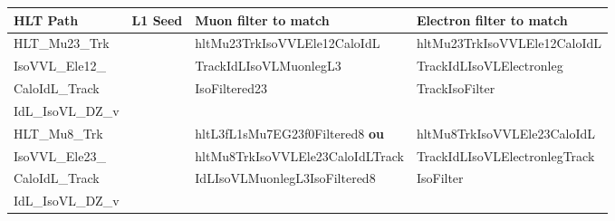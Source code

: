 {\footnotesize
\begin{tabularx}{\textwidth}{llXX}
\toprule
HLT Path & L1 Seed & Muon filter to match & Electron filter to match \\
\midrule
HLT\_Mu23\_Trk
&
\todo{???}
&
hltMu23TrkIsoVVLEle12CaloIdL
&
hltMu23TrkIsoVVLEle12CaloIdL
\\
IsoVVL\_Ele12\_
&
&
TrackIdLIsoVLMuonlegL3
&
TrackIdLIsoVLElectronleg
\\
CaloIdL\_Track
&
&
IsoFiltered23
&
TrackIsoFilter
\\
IdL\_IsoVL\_DZ\_v
\\\hline
HLT\_Mu8\_Trk
&
\todo{???}
&
hltL3fL1sMu7EG23f0Filtered8 \textbf{ou}
&
hltMu8TrkIsoVVLEle23CaloIdL
\\
IsoVVL\_Ele23\_
&
&
hltMu8TrkIsoVVLEle23CaloIdLTrack
&
TrackIdLIsoVLElectronlegTrack
\\
CaloIdL\_Track
&
&
IdLIsoVLMuonlegL3IsoFiltered8
&
IsoFilter
\\
IdL\_IsoVL\_DZ\_v
\\
\bottomrule
\end{tabularx}
}
